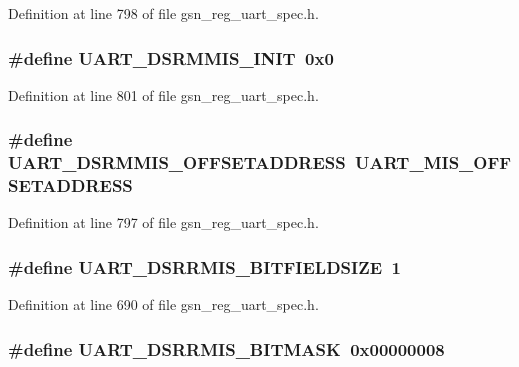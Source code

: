 Definition at line 798 of file gsn\_\-reg\_\-uart\_\-spec.h.

\hypertarget{a00575_a68b4d831e83e44ef682f1e34bcd1b540}{
\subsubsection[{UART\_\-DSRMMIS\_\-INIT}]{\setlength{\rightskip}{0pt plus 5cm}\#define UART\_\-DSRMMIS\_\-INIT~0x0}}
\label{a00575_a68b4d831e83e44ef682f1e34bcd1b540}


Definition at line 801 of file gsn\_\-reg\_\-uart\_\-spec.h.

\hypertarget{a00575_ab81acbc0fa07aae11c523e654495c646}{
\subsubsection[{UART\_\-DSRMMIS\_\-OFFSETADDRESS}]{\setlength{\rightskip}{0pt plus 5cm}\#define UART\_\-DSRMMIS\_\-OFFSETADDRESS~UART\_\-MIS\_\-OFFSETADDRESS}}
\label{a00575_ab81acbc0fa07aae11c523e654495c646}


Definition at line 797 of file gsn\_\-reg\_\-uart\_\-spec.h.

\hypertarget{a00575_a189bd417c4629606724e0cba0d42f15d}{
\subsubsection[{UART\_\-DSRRMIS\_\-BITFIELDSIZE}]{\setlength{\rightskip}{0pt plus 5cm}\#define UART\_\-DSRRMIS\_\-BITFIELDSIZE~1}}
\label{a00575_a189bd417c4629606724e0cba0d42f15d}


Definition at line 690 of file gsn\_\-reg\_\-uart\_\-spec.h.

\hypertarget{a00575_a8b3405057359d55ebd45b5d5731c8bcd}{
\subsubsection[{UART\_\-DSRRMIS\_\-BITMASK}]{\setlength{\rightskip}{0pt plus 5cm}\#define UART\_\-DSRRMIS\_\-BITMASK~0x00000008}}
\label{a00575_a8b3405057359d55ebd45b5d5731c8bcd}


